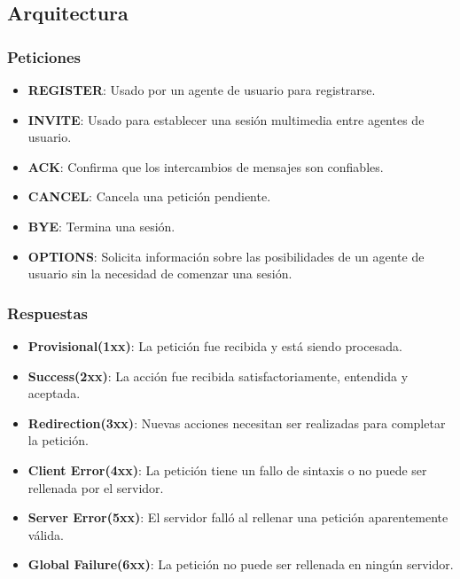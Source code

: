 \documentclass{beamer}
\begin{document}
\subsection{Arquitectura}
\begin{frame}
\frametitle{Peticiones}
		\begin{itemize}
			\item \textbf{REGISTER}: Usado por un agente de usuario para registrarse.
			\item \textbf{INVITE}: Usado para establecer una sesión multimedia entre agentes de usuario.
			\item \textbf{ACK}: Confirma que los intercambios de mensajes son confiables.
			\item \textbf{CANCEL}: Cancela una petición pendiente.
			\item \textbf{BYE}: Termina una sesión.
			\item \textbf{OPTIONS}: Solicita información sobre las posibilidades de un agente de usuario sin la necesidad de comenzar una sesión.
		\end{itemize}
\end{frame}
\begin{frame}
\frametitle{Respuestas}
\begin{itemize}
			\item \textbf{Provisional(1xx)}: La petición fue recibida y está siendo  procesada.
			\item \textbf{Success(2xx)}: La acción fue recibida satisfactoriamente, entendida y aceptada.
			\item \textbf{Redirection(3xx)}: Nuevas acciones necesitan ser realizadas para completar la petición.
			\item \textbf{Client Error(4xx)}: La petición tiene un fallo de sintaxis o no puede ser rellenada por el servidor.
			\item \textbf{Server Error(5xx)}: El servidor falló al rellenar una petición aparentemente válida.
			\item \textbf{Global Failure(6xx)}: La petición no puede ser rellenada en ningún servidor.
		\end{itemize}
\end{frame}
\end{document}
